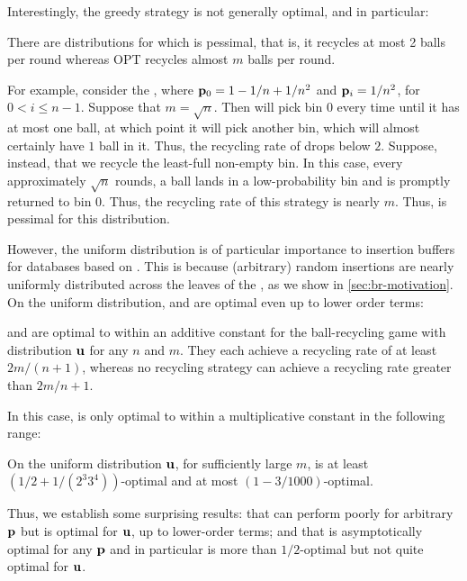 Interestingly, the greedy strategy \FB is not generally optimal, and in
particular:
\begin{observation}
There are distributions for which \FB is pessimal, that is, it
recycles at most 2 balls per round whereas OPT recycles almost $m$
balls per round.
\end{observation}
For example, consider the , where $\mathbf{p}_0 =
1-1/n+1/n^2$ and $\mathbf{p}_i = 1/n^2$, for $0<i\leq n-1$.  Suppose that $m=\sqrt{n}$.
Then \FB will pick bin $0$ every time until it has at most one ball, at which
point it will pick another bin, which will almost certainly have $1$ ball in
it.  Thus, the recycling rate of \FB drops below $2$.  Suppose, instead, that
we recycle the least-full non-empty bin.  In this case, every approximately
$\sqrt{n}$ rounds, a ball lands in a low-probability bin and is promptly
returned to bin $0$. Thus, the recycling rate of this strategy is nearly $m$.
Thus, \FB is pessimal for this distribution.

However, the uniform distribution is of particular importance to insertion
buffers for databases based on \btrees{}. This is because (arbitrary) random
\btree{} insertions are nearly uniformly distributed across the leaves of the
\btree{}, as we show in \cref{sec:br-motivation}. On the uniform distribution, \FB
and \GG are optimal even up to lower order terms:

\begin{theorem}\label{thm:fullestbin}
  \FB and \GG are optimal to within an additive constant for the
  ball-recycling game with distribution $\mathbf{u}$ 
  for any $n$ and $m$.  They each achieve a
  recycling rate of at least $2m/(n+1)$, whereas no recycling strategy can
  achieve a recycling rate greater than $2m/n + 1$.
\end{theorem}

In this case, \RB is only optimal to within a multiplicative constant
in the following range:

\begin{theorem}\label{thm:rbuniform}
	On the uniform distribution $\mathbf{u}$, for sufficiently large
        $m$, \RB is at least $(1/2+1/(2^3
	3^4))$-optimal and at most $(1-3/1000)$-optimal.
\end{theorem}

Thus, we establish some surprising results: that \FB can perform poorly for
arbitrary $\mathbf{p}$ but is optimal for $\mathbf{u}$, up to lower-order terms; and that \RB
is asymptotically optimal for any $\mathbf{p}$ and in particular is more than
$1/2$-optimal but not quite optimal for $\mathbf{u}$.

